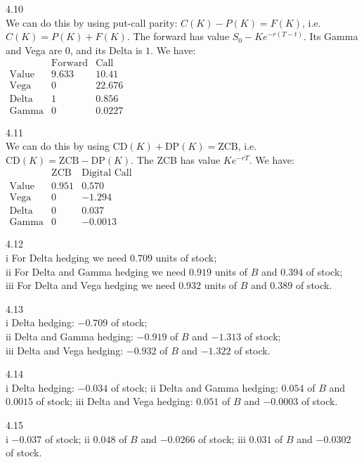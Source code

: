 4.10 \\
We can do this by using put-call parity: $C(K)-P(K)=F(K)$, i.e. $C(K)=P(K)+F(K)$. The forward has value $S_0-Ke^{-r(T-t)}$. Its Gamma and Vega are $0$, and its Delta is $1$. We have: \\

$
\begin{matrix}
\text{ } & \text{Forward} & \text{Call} \\
\text{Value} & 9.633 & 10.41 \\
\text{Vega} & 0 & 22.676 \\
\text{Delta} & 1 & 0.856 \\
\text{Gamma} & 0 & 0.0227
\end{matrix}
$

4.11 \\
We can do this by using $\text{CD}(K)+\text{DP}(K)=\text{ZCB}$, i.e. $\text{CD}(K)=\text{ZCB}-\text{DP}(K)$. The ZCB has value $Ke^{-rT}$. We have: \\

$
\begin{matrix}
\text{ } & \text{ZCB} & \text{Digital Call} \\
\text{Value} & 0.951 & 0.570 \\
\text{Vega} & 0 & -1.294 \\
\text{Delta} & 0 & 0.037 \\
\text{Gamma} & 0 & -0.0013
\end{matrix}
$

4.12 \\
i For Delta hedging we need $0.709$ units of stock; \\
ii For Delta and Gamma hedging we need $0.919$ units of $B$ and $0.394$ of stock; \\
iii For Delta and Vega hedging we need $0.932$ units of $B$ and $0.389$ of stock.

4.13 \\
i Delta hedging: $-0.709$ of stock; \\
ii Delta and Gamma hedging: $-0.919$ of $B$ and $-1.313$ of stock; \\
iii Delta and Vega hedging: $-0.932$ of $B$ and $-1.322$ of stock.

4.14 \\
i Delta hedging: $-0.034$ of stock;
ii Delta and Gamma hedging: $0.054$ of $B$ and $0.0015$ of stock;
iii Delta and Vega hedging: $0.051$ of $B$ and $-0.0003$ of stock.

4.15 \\
i $-0.037$ of stock;
ii $0.048$ of $B$ and $-0.0266$ of stock;
iii $0.031$ of $B$ and $-0.0302$ of stock.

